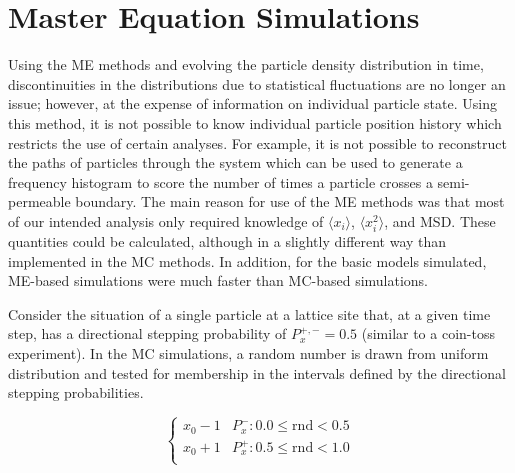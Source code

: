 \section{Master Equation Simulations}
\label{section:me-sims}
	
	Using the ME methods and evolving the particle density distribution in time, discontinuities in the distributions due to statistical fluctuations are no longer an issue; however, at the expense of information on individual particle state. Using this method, it is not possible to know individual particle position history which restricts the use of certain analyses. For example, it is not possible to reconstruct the paths of particles through the system which can be used to generate a frequency histogram to score the number of times a particle crosses a semi-permeable boundary. The main reason for use of the ME methods was that most of our intended analysis only required knowledge of $ \langle x_{i} \rangle $, $ \langle x_{i}^2 \rangle $, and MSD. These quantities could be calculated, although in a slightly different way than implemented in the MC methods. In addition, for the basic models simulated, ME-based simulations were much faster than MC-based simulations.
	
	Consider the situation of a single particle at a lattice site that, at a given time step, has a directional stepping probability of $ P_x^{+,-} = 0.5 $ (similar to a coin-toss experiment). In the MC simulations, a random number is drawn from uniform distribution and tested for membership in the intervals defined by the directional stepping probabilities.
	
	\[   \left\{
	\begin{array}{ll}
	      x_0 - 1 & P_x^{-}: 0.0 \leq \textrm{rnd} < 0.5 \\
	      x_0 + 1 & P_x^{+}: 0.5 \leq \textrm{rnd} < 1.0 \\
	\end{array} 
	\right. \]
	
